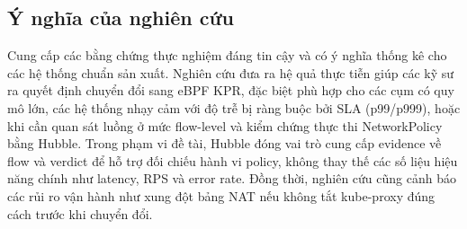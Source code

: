 \subsection{Ý nghĩa của nghiên cứu} %
Cung cấp các bằng chứng thực nghiệm đáng tin cậy và có ý nghĩa thống kê cho các hệ thống chuẩn sản xuất. Nghiên cứu đưa ra hệ quả thực tiễn 
giúp các kỹ sư ra quyết định chuyển đổi sang eBPF KPR, đặc biệt phù hợp cho các cụm có quy mô lớn, các hệ thống 
nhạy cảm với độ trễ bị ràng buộc bởi SLA (p99/p999), hoặc khi cần quan sát luồng ở mức flow-level và kiểm chứng thực thi NetworkPolicy bằng Hubble. Trong phạm vi đề tài, Hubble đóng vai trò cung cấp evidence về flow và verdict để hỗ trợ đối chiếu hành vi policy, không thay thế các số liệu hiệu năng chính như latency, RPS và error rate. Đồng thời, nghiên cứu cũng cảnh báo các rủi ro 
vận hành như xung đột bảng NAT nếu không tắt kube-proxy đúng cách trước khi chuyển đổi.
